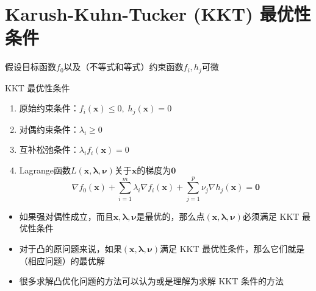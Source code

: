 
\section{Karush-Kuhn-Tucker (KKT) 最优性条件}


\begin{frame}

假设目标函数$f_0$以及（不等式和等式）约束函数$f_i,h_j$可微

\pause

\begin{block}{KKT 最优性条件}
\begin{enumerate}
\item 原始约束条件：$f_i(\mathbf{x}) \le 0, \; h_j(\mathbf{x}) = 0$
\item 对偶约束条件：$\lambda_i \ge 0$
\item 互补松弛条件：$\lambda_if_i(\mathbf{x}) = 0$
\item Lagrange函数$L(\mathbf{x}, \boldsymbol\lambda, \boldsymbol\nu)$关于$\mathbf{x}$的梯度为$\mathbf{0}$
\[\nabla f_0(\mathbf{x}) + \sum\limits_{i=1}^m \lambda_i \nabla f_i(\mathbf{x}) + \sum\limits_{j=1}^p \nu_j \nabla h_j(\mathbf{x}) = \mathbf{0}\]
\end{enumerate}
\end{block}

\end{frame}


\begin{frame}

\begin{itemize}
\item 如果强对偶性成立，而且$\mathbf{x}, \boldsymbol\lambda, \boldsymbol\nu$是最优的，那么点$(\mathbf{x}, \boldsymbol\lambda, \boldsymbol\nu)$必须满足 KKT 最优性条件
\vspace{0.5em}
\item 对于凸的原问题来说，如果$(\mathbf{x}, \boldsymbol\lambda, \boldsymbol\nu)$满足 KKT 最优性条件，那么它们就是（相应问题）的最优解
\vspace{0.5em}
\item 很多求解凸优化问题的方法可以认为或是理解为求解 KKT 条件的方法
\end{itemize}

\end{frame}

